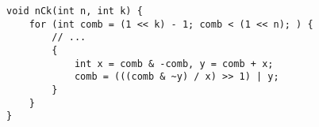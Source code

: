 \begin{lstlisting}
void nCk(int n, int k) {
	for (int comb = (1 << k) - 1; comb < (1 << n); ) {
		// ...
		{
			int x = comb & -comb, y = comb + x;
			comb = (((comb & ~y) / x) >> 1) | y;
		}
	}
}
\end{lstlisting}
